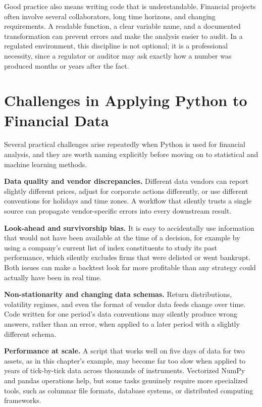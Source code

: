 \documentclass[../ai_in_finance]{subfiles}
\begin{document}
Good practice also means writing code that is understandable. Financial projects often involve several collaborators, long time horizons, and changing requirements. A readable function, a clear variable name, and a documented transformation can prevent errors and make the analysis easier to audit. In a regulated environment, this discipline is not optional; it is a professional necessity, since a regulator or auditor may ask exactly how a number was produced months or years after the fact.

\section{Challenges in Applying Python to Financial Data}

Several practical challenges arise repeatedly when Python is used for financial analysis, and they are worth naming explicitly before moving on to statistical and machine learning methods.

\textbf{Data quality and vendor discrepancies.} Different data vendors can report slightly different prices, adjust for corporate actions differently, or use different conventions for holidays and time zones. A workflow that silently trusts a single source can propagate vendor-specific errors into every downstream result.

\textbf{Look-ahead and survivorship bias.} It is easy to accidentally use information that would not have been available at the time of a decision, for example by using a company's current list of index constituents to study its past performance, which silently excludes firms that were delisted or went bankrupt. Both issues can make a backtest look far more profitable than any strategy could actually have been in real time.

\textbf{Non-stationarity and changing data schemas.} Return distributions, volatility regimes, and even the format of vendor data feeds change over time. Code written for one period's data conventions may silently produce wrong answers, rather than an error, when applied to a later period with a slightly different schema.

\textbf{Performance at scale.} A script that works well on five days of data for two assets, as in this chapter's example, may become far too slow when applied to years of tick-by-tick data across thousands of instruments. Vectorized NumPy and pandas operations help, but some tasks genuinely require more specialized tools, such as columnar file formats, database systems, or distributed computing frameworks.
\end{document}

